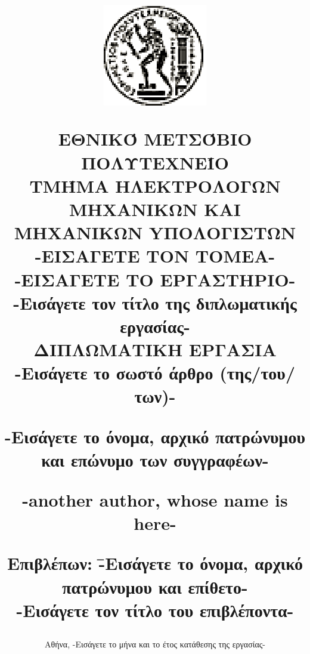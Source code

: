 \documentclass[12pt, twoside, a4paper]{report}
\begin{document}
\title{
\vspace{-6ex}
\begin{center}
\includegraphics[scale=1]{pyrforos.eps}
\end{center}
\Large{Ε}\large{ΘΝΙΚΌ}
\Large{Μ}\large{ΕΤΣΌΒΙΟ}
\Large{Π}\large{ΟΛΥΤΕΧΝΕΊΟ} \\
\normalsize{Τ}\small{ΜΉΜΑ}
\normalsize{H}\small{ΛΕΚΤΡΟΛΟΓΩΝ}
\normalsize{M}\small{ΗΧΑΝΙΚΩΝ}
\normalsize{K}\small{AI}
\normalsize{M}\small{ΗΧΑΝΙΚΩΝ}
\normalsize{Y}\small{ΠΟΛΟΓΙΣΤΩΝ} \\
\vspace{2ex}
-ΕΙΣΑΓΕΤΕ ΤΟΝ ΤΟΜΕΑ- \\
-ΕΙΣΑΓΕΤΕ ΤΟ ΕΡΓΑΣΤΗΡΙΟ- \\
\vspace{8ex}
\large \textbf{-Εισάγετε τον τίτλο της διπλωματικής εργασίας-} \\
\vspace{10ex}
\large
ΔΙΠΛΩΜΑΤΙΚΗ ΕΡΓΑΣΙΑ\\
\vspace{2ex}
\normalsize
-Εισάγετε το σωστό άρθρο (της/του/των)- \\
\vspace{2ex}
\parbox[c]{0.4\textwidth} { \center\textbf{
-Εισάγετε το όνομα, αρχικό πατρώνυμου και επώνυμο των συγγραφέων- }}
\parbox[c]{0.4\textwidth} { \center\textbf{
	-another author, whose name is here- }}
\vspace{10ex}
\flushleft
\begin{tabbing}
	\textbf{Επιβλέπων}: \= -Εισάγετε το όνομα, αρχικό πατρώνυμου
				και επίθετο- \\
			    \> -Εισάγετε τον τίτλο του επιβλέποντα-
\end{tabbing}
}
\date{
\normalsize
Αθήνα, -Εισάγετε το μήνα και το έτος κατάθεσης της εργασίας-}
\end{document}
